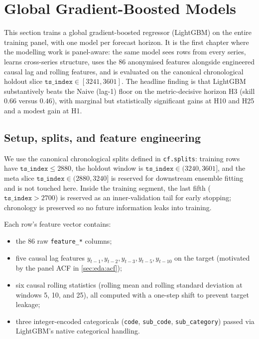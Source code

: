 \section{Global Gradient-Boosted Models}
\label{sec:lgbm}

This section trains a global gradient-boosted regressor (LightGBM) on the entire training panel, with one model per forecast horizon. It is the first chapter where the modelling work is panel-aware: the same model sees rows from every series, learns cross-series structure, uses the 86 anonymised features alongside engineered causal lag and rolling features, and is evaluated on the canonical chronological holdout slice $\mathtt{ts\_index} \in [3241, 3601]$. The headline finding is that LightGBM substantively beats the Naive (lag-1) floor on the metric-decisive horizon H3 (skill $0.66$ versus $0.46$), with marginal but statistically significant gains at H10 and H25 and a modest gain at H1.

\subsection{Setup, splits, and feature engineering}
\label{sec:lgbm:setup}

We use the canonical chronological splits defined in \texttt{cf.splits}: training rows have $\mathtt{ts\_index} \le 2880$, the holdout window is $\mathtt{ts\_index} \in (3240, 3601]$, and the meta slice $\mathtt{ts\_index} \in (2880, 3240]$ is reserved for downstream ensemble fitting and is not touched here. Inside the training segment, the last fifth (\(\mathtt{ts\_index} > 2700\)) is reserved as an inner-validation tail for early stopping; chronology is preserved so no future information leaks into training.

Each row's feature vector contains:

\begin{itemize}
  \item the 86 raw \texttt{feature\_*} columns;
  \item five causal lag features $y_{t-1}, y_{t-2}, y_{t-3}, y_{t-5}, y_{t-10}$ on the target (motivated by the panel ACF in \cref{sec:eda:acf});
  \item six causal rolling statistics (rolling mean and rolling standard deviation at windows 5, 10, and 25), all computed with a one-step shift to prevent target leakage;
  \item three integer-encoded categoricals (\texttt{code}, \texttt{sub\_code}, \texttt{sub\_category}) passed via LightGBM's native categorical handling.
\end{itemize}

